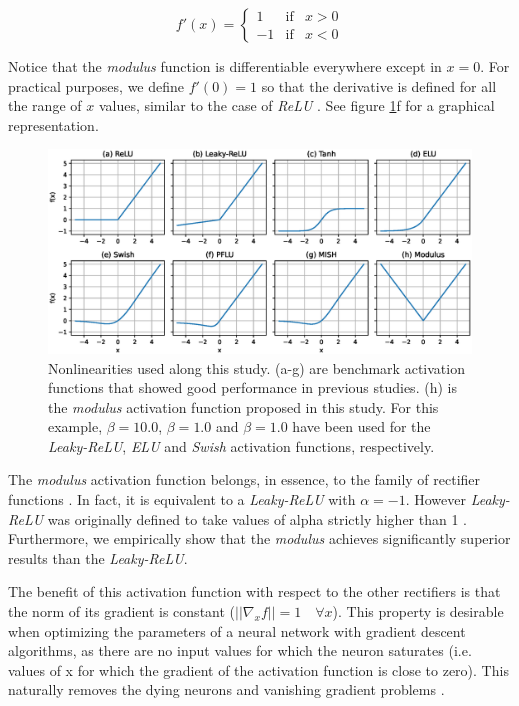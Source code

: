 $$
f'(x)= \left\{ \begin{array}{lcc}
1 &   \text{if}  & x > 0 \\
-1 &  \text{if} & x < 0 
\end{array} \right.
$$

Notice that the \textit{modulus} function is differentiable everywhere except in $x = 0$. For practical purposes, we define $f'(0) = 1$ so that the derivative is defined for all the range of $x$ values, similar to the case of \textit{ReLU} \cite{goodfellow2016}. See figure \ref{fig:activations}f for a graphical representation.


\begin{figure}
	\centering
	\includegraphics[width=1.0\linewidth]{modulus/images/activations}
	\caption{Nonlinearities used along this study. (a-g) are benchmark activation functions that showed good performance in previous studies. (h) is the \textit{modulus} activation function proposed in this study. For this example, $\beta=10.0$, $\beta=1.0$ and $\beta=1.0$ have been used for the \textit{Leaky-ReLU}, \textit{ELU} and \textit{Swish} activation functions, respectively.}
	\label{fig:activations}
\end{figure}

The \textit{modulus} activation function belongs, in essence, to the family of rectifier functions \cite{glorot2015} . In fact, it is equivalent to a \textit{Leaky-ReLU} with $\alpha=-1$. However \textit{Leaky-ReLU} was originally defined to take values of alpha strictly higher than 1 \cite{xu2015}. Furthermore, we empirically show that the \textit{modulus} achieves significantly superior results than the \textit{Leaky-ReLU}.

The benefit of this activation function with respect to the other rectifiers is that the norm of its gradient is constant ($||\nabla_x f|| = 1 \quad \forall x$). This property is desirable when optimizing the parameters of a neural network with gradient descent algorithms, as there are no input values for which the neuron saturates \cite{glorot2010} (i.e. values of x for which the gradient of the activation function is close to zero). This naturally removes the dying neurons \cite{lu2020} and vanishing gradient problems \cite{pascanu13, hochreiter1998, Hochreiter2001}.

